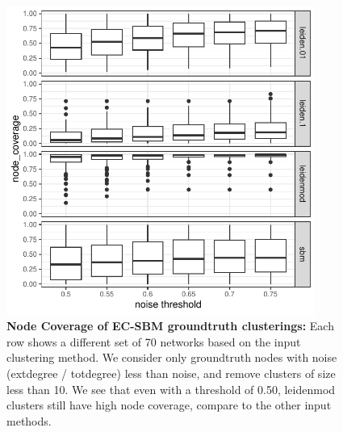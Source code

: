\documentclass[aps,pre,superscriptaddress]{article}
\begin{document}
\begin{figure}[!htpb]
    \centering
    \includegraphics[width=0.9\textwidth]{figures/node_coverage_threshold.pdf}
    \caption[]{\textbf{Node Coverage of EC-SBM groundtruth clusterings:} Each row shows a different set of 70 networks based on the input clustering method. We consider only groundtruth nodes with noise (extdegree / totdegree) less than noise, and remove clusters of size less than 10. We see that even with a threshold of 0.50, leidenmod clusters still have high node coverage, compare to the other input methods. }
\end{figure}
\end{document}
